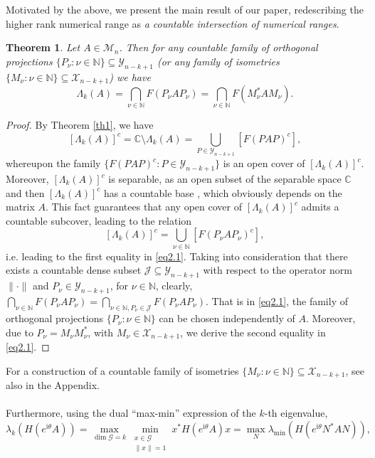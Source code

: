 \documentclass[12pt, reqno]{amsart}
\newtheorem{theorem}{Theorem}[section]
\theoremstyle{definition}
\theoremstyle{remark}
\numberwithin{equation}{section}
\begin{document}
Motivated by the above, we present the main result of our paper, redescribing the higher rank numeri\-cal range as  \textit{a countable intersection of numerical ranges}.
\begin{theorem}\label{th2}
Let $A\in\mathcal{M}_{n}$. Then for any countable family of orthogonal projections $\{P_{\nu}: \nu\in\mathbb{N}\}\subseteq\mathcal{Y}_{n-k+1}$
(or any family of isometries $\{M_{\nu}: \nu\in\mathbb{N}\}\subseteq\mathcal{X}_{n-k+1}$) we have
\begin{equation}\label{eq2.1}
\Lambda_{k}(A)=\bigcap_{\nu\in\mathbb{N}}F(P_{\nu}AP_{\nu})=\bigcap_{\nu\in\mathbb{N}}F(M_{\nu}^{*}AM_{\nu}).
\end{equation}
\end{theorem}
\begin{proof}
By Theorem \ref{th1}, we have
\[
[\Lambda_{k}(A)]^{c}=\mathbb{C}\setminus\Lambda_{k}(A)=\bigcup_{P\in\mathcal{Y}_{n-k+1}}[F(PAP)^{c}],
\]
whereupon the family  $\{F(PAP)^{c}: P\in\mathcal{Y}_{n-k+1}\}$ is an open cover of $[\Lambda_{k}(A)]^{c}$.
Moreover, $[\Lambda_{k}(A)]^{c}$ is separable, as an open  subset of the sepa\-rable space $\mathbb{C}$ and then $[\Lambda_{k}(A)]^{c}$ has a countable base \cite{top}, which obviously depends on the matrix $A$. This fact guarantees that any open cover of $[\Lambda_{k}(A)]^{c}$ admits a countable subcover, leading to the relation
\[
[\Lambda_{k}(A)]^{c}=\bigcup_{\nu\in\mathbb{N}}[F(P_{\nu}AP_{\nu})^{c}],
\]
i.e. leading to the first equality in \eqref{eq2.1}. Taking into consideration that there exists a countable dense subset $\mathcal{J}\subseteq\mathcal{Y}_{n-k+1}$ with respect to the operator norm $\|\cdot\|$ and $P_{\nu}\in\mathcal{Y}_{n-k+1}$, for $\nu\in\mathbb{N}$, clearly, $\bigcap_{\nu\in\mathbb{N}}F(P_{\nu}AP_{\nu})=\bigcap_{\nu\in\mathbb{N},P_{\nu}\in \mathcal{J}}F(P_{\nu}AP_{\nu})$.
That is in \eqref{eq2.1}, the family of orthogonal projections $\{P_{\nu}: \nu\in\mathbb{N}\}$ can be chosen independently of $A$. Moreover, due to $P_{\nu}=M_{\nu}M^{*}_{\nu}$, with $M_{\nu}\in\mathcal{X}_{n-k+1}$, we derive the second equality in \eqref{eq2.1}.
\end{proof}
For a construction of a countable family of isometries $\{M_{\nu}: \nu\in\mathbb{N}\}\subseteq\mathcal{X}_{n-k+1}$, see also in the Appendix.
\\\\
Furthermore, using the dual ``max-min'' expression of the $k$-th eigenvalue,
\[
\lambda_{k}(H(e^{\mathrm{i}\theta}A))=\max_{\dim \mathcal{G}=k}{\min_{\substack{x\in\mathcal{G}\\ \|x\|=1}}{x^{*}H(e^{\mathrm{i}\theta}A)x}}=
\max_{N}{\lambda_{\min}(H(e^{\mathrm{i}\theta}N^{*}AN))},
\]
\end{document}
